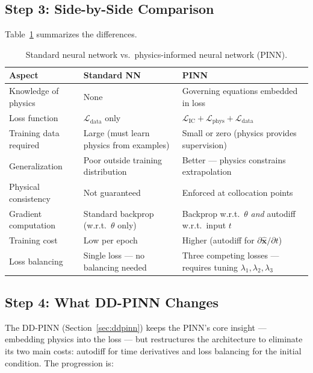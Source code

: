 \documentclass[11pt]{article}
\newcommand{\xhat}{\hat{\bm{x}}}
\begin{document}
\subsection{Step 3: Side-by-Side Comparison}

Table~\ref{tab:nn-vs-pinn} summarizes the differences.

\begin{table}[H]
\centering
\caption{Standard neural network vs.\ physics-informed neural network (PINN).}
\label{tab:nn-vs-pinn}
\begin{tabular}{@{}p{3.8cm}p{5cm}p{5cm}@{}}
\toprule
\textbf{Aspect} & \textbf{Standard NN} & \textbf{PINN} \\
\midrule
Knowledge of physics & None & Governing equations embedded in loss \\
\addlinespace[0.3em]
Loss function & $\mathcal{L}_{\mathrm{data}}$ only & $\mathcal{L}_{\mathrm{IC}} + \mathcal{L}_{\mathrm{phys}} + \mathcal{L}_{\mathrm{data}}$ \\
\addlinespace[0.3em]
Training data required & Large (must learn physics from examples) & Small or zero (physics provides supervision) \\
\addlinespace[0.3em]
Generalization & Poor outside training distribution & Better --- physics constrains extrapolation \\
\addlinespace[0.3em]
Physical consistency & Not guaranteed & Enforced at collocation points \\
\addlinespace[0.3em]
Gradient computation & Standard backprop (w.r.t.\ $\theta$ only) & Backprop w.r.t.\ $\theta$ \emph{and} autodiff w.r.t.\ input $t$ \\
\addlinespace[0.3em]
Training cost & Low per epoch & Higher (autodiff for $\partial \xhat / \partial t$) \\
\addlinespace[0.3em]
Loss balancing & Single loss --- no balancing needed & Three competing losses --- requires tuning $\lambda_1, \lambda_2, \lambda_3$ \\
\bottomrule
\end{tabular}
\end{table}

\subsection{Step 4: What DD-PINN Changes}

The DD-PINN (Section~\ref{sec:ddpinn}) keeps the PINN's core insight --- embedding physics into the loss --- but restructures the architecture to eliminate its two main costs: autodiff for time derivatives and loss balancing for the initial condition. The progression is:
\end{document}
